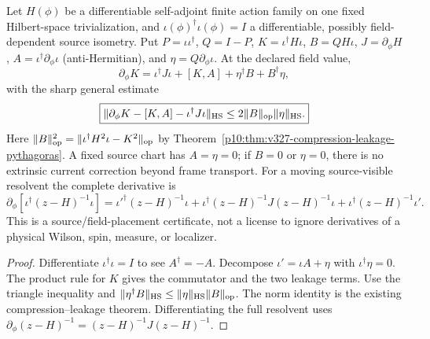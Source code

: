 \documentclass[12pt,a4paper]{article}
\begin{document}
\begin{proposition}
\label{p10:prop:v375-moving-source-current}
Let $H(\phi)$ be a differentiable self-adjoint finite action family
on one fixed Hilbert-space trivialization, and
$\iota(\phi)^\dagger\iota(\phi)=I$ a differentiable, possibly
field-dependent source isometry. Put
$P=\iota\iota^\dagger$, $Q=I-P$,
$K=\iota^\dagger H\iota$, $B=QH\iota$,
$J=\partial_\phi H$, $A=\iota^\dagger\partial_\phi\iota$
(anti-Hermitian), and $\eta=Q\partial_\phi\iota$.
At the declared field value,
\[
\boxed{\partial_\phi K=\iota^\dagger J\iota
 +[K,A]+\eta^\dagger B+B^\dagger\eta,}
\]
with the sharp general estimate
\[
\boxed{\|\partial_\phi K-[K,A]-\iota^\dagger J\iota\|_{\rm HS}
 \le2\|B\|_{\rm op}\|\eta\|_{\rm HS}.}
\]
Here $\|B\|_{\rm op}^2=\|\iota^\dagger H^2\iota-K^2\|_{\rm op}$
by Theorem~\ref{p10:thm:v327-compression-leakage-pythagoras}.
A fixed source chart has $A=\eta=0$; if $B=0$ or $\eta=0$,
there is no extrinsic current correction beyond frame transport.
For a moving source-visible resolvent the complete derivative is
\[
 \partial_\phi[\iota^\dagger(z-H)^{-1}\iota]
 =\iota'^\dagger(z-H)^{-1}\iota
 +\iota^\dagger(z-H)^{-1}J(z-H)^{-1}\iota
 +\iota^\dagger(z-H)^{-1}\iota'.
\]
This is a source/field-placement certificate, not a license to
ignore derivatives of a physical Wilson, spin, measure, or localizer.
\end{proposition}
\begin{proof}
Differentiate $\iota^\dagger\iota=I$ to see $A^\dagger=-A$.
Decompose $\iota'=\iota A+\eta$ with $\iota^\dagger\eta=0$.
The product rule for $K$ gives the commutator and the two leakage
terms. Use the triangle inequality and
$\|\eta^\dagger B\|_{\rm HS}\le
\|\eta\|_{\rm HS}\|B\|_{\rm op}$.
The norm identity is the existing compression--leakage theorem.
Differentiating the full resolvent uses
$\partial_\phi(z-H)^{-1}=(z-H)^{-1}J(z-H)^{-1}$.
\end{proof}
\end{document}
